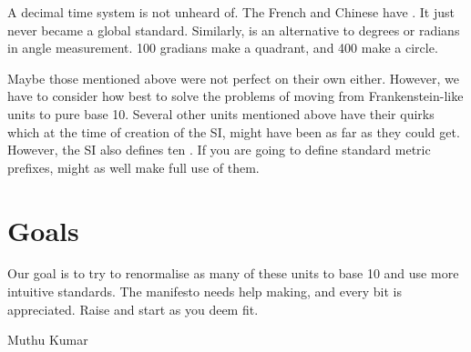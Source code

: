 A decimal time system is not unheard of. The French and Chinese have . It just never became a global standard. Similarly,  is an alternative to degrees or radians in angle measurement. 100 gradians make a quadrant, and 400 make a circle.

Maybe those mentioned above were not perfect on their own either. However, we have to consider how best to solve the problems of moving from Frankenstein-like units to pure base 10. Several other units mentioned above have their quirks which at the time of creation of the SI, might have been as far as they could get. However, the SI also defines ten . If you are going to define standard metric prefixes, might as well make full use of them.

\section*{Goals}
Our goal is to try to renormalise as many of these units to base 10 and use more intuitive standards. The  manifesto needs help making, and every bit is appreciated. Raise  and start  as you deem fit.

\medskip
\begin{flushright}
  Muthu Kumar
\end{flushright}
